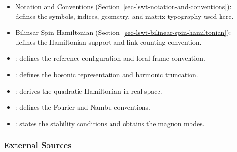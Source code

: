 \begin{itemize}
\tightlist
\item
  Notation and Conventions (Section~\ref{sec-lswt-notation-and-conventions}): defines the symbols, indices, geometry, and matrix typography used here.
\item
  Bilinear Spin Hamiltonian (Section~\ref{sec-lswt-bilinear-spin-hamiltonian}): defines the Hamiltonian support and link-counting convention.
\item
  : defines the reference configuration and local-frame convention.
\item
  : defines the bosonic representation and harmonic truncation.
\item
  : derives the quadratic Hamiltonian in real space.
\item
  : defines the Fourier and Nambu conventions.
\item
  : states the stability conditions and obtains the magnon modes.
\end{itemize}

\subsubsection{External Sources}

